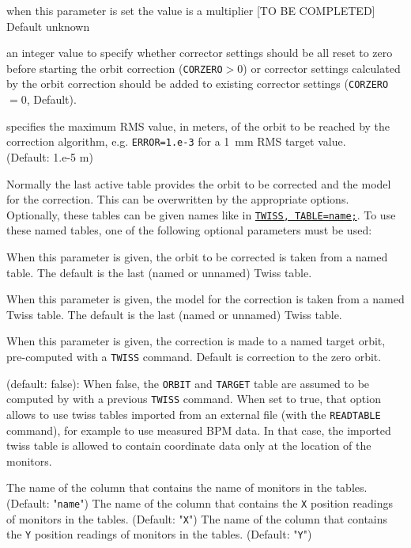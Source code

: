 \begin{madlist}
    when this parameter is set the value is a multiplier [TO BE COMPLETED] 
     \\ Default unknown

    an integer value to specify whether corrector settings 
     should be all reset to zero before starting the orbit correction 
     (\texttt{CORZERO}$>0$) 
     or corrector settings calculated by the orbit correction should be added to 
     existing corrector settings (\texttt{CORZERO}$=0$, Default).

    specifies the maximum RMS value, in meters, of the 
     orbit to be reached by the correction algorithm, 
     e.g. \texttt{ERROR=1.e-3} for a 1~mm RMS target value. 
     \\ (Default: 1.e-5 m)

\end{madlist}

Normally the last active table provides the orbit to be
corrected and the model for the correction. This can be overwritten
by the appropriate options. Optionally, these tables can be given
names like in \hyperref[chap:twiss]{\texttt{TWISS, TABLE=name;}}. 
To use these named tables, one of the following optional
parameters must be  used:  

\begin{madlist}
    When this parameter is given, the orbit to be corrected
     is taken from a named table. The default is the last (named or
     unnamed) Twiss table.  

    When this parameter is given, the model for the
     correction is taken from a named Twiss table. The default is the
     last (named or unnamed) Twiss table.  

    When this parameter is given, the correction is made to
     a named target orbit, pre-computed with a \texttt{TWISS} command. Default is
     correction to the zero orbit.  

    (default: false): When false, the \texttt{ORBIT} and 
     \texttt{TARGET} table
     are assumed to be computed by \mad with a previous \texttt{TWISS}
     command. When set to true, that option allows to use twiss tables
     imported from an external file (with the \texttt{READTABLE} command), for
     example to use measured BPM data. In that case, the imported twiss
     table is allowed to contain coordinate data only at the location of
     the monitors.  
     
    The name of the column that contains the name of 
     monitors in the tables. (Default: "\texttt{name}")
    The name of the column that contains the \texttt{X} position 
     readings of monitors in the tables. (Default: "\texttt{X}")
    The name of the column that contains the \texttt{Y} position 
     readings of monitors in the tables. (Default: "\texttt{Y}")
     
\end{madlist}

